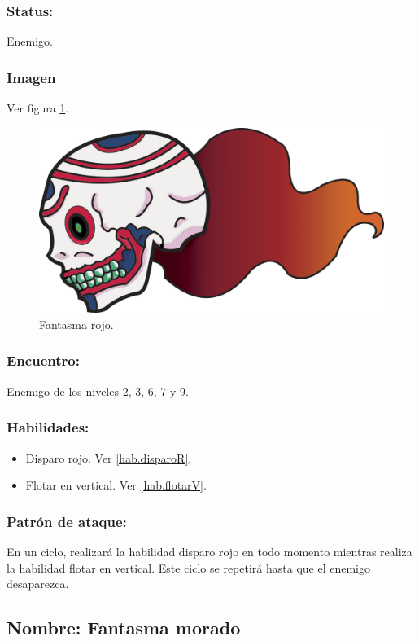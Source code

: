 \documentclass[11pt,letterpaper]{article}
\begin{document}
\subsubsection{Status:}
Enemigo.
\subsubsection{Imagen}
Ver figura \ref{fig:fantasmaR}.
\begin{figure}
	\centering
	\includegraphics[height=0.2 \textheight]{Imagenes/fantasmaRojo}
	\caption{Fantasma rojo.}
	\label{fig:fantasmaR}
\end{figure} 
\subsubsection{Encuentro:}
Enemigo de los niveles 2, 3, 6, 7 y 9.
\subsubsection{Habilidades:}
\begin{itemize}
	\item Disparo rojo. Ver \ref{hab.disparoR}.
	\item Flotar en vertical. Ver \ref{hab.flotarV}.
\end{itemize}
\subsubsection{Patrón de ataque:}
En un ciclo, realizará la habilidad disparo rojo en todo momento mientras realiza la habilidad flotar en vertical. Este ciclo se repetirá hasta que el enemigo desaparezca.

\subsection{Nombre: Fantasma morado}   \label{per.fantasmaM}
\end{document}
